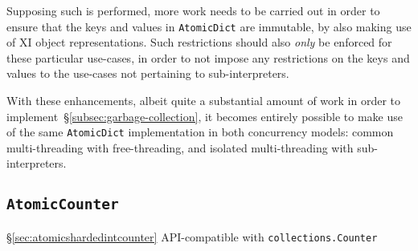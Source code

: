 Supposing such is performed, more work needs to be carried out in order to ensure that the keys and values in \texttt{AtomicDict} are immutable, by also making use of XI object representations.
Such restrictions should also \emph{only} be enforced for these particular use-cases, in order to not impose any restrictions on the keys and values to the use-cases not pertaining to sub-interpreters.

With these enhancements, albeit quite a substantial amount of work in order to implement~\S\ref{subsec:garbage-collection}, it becomes entirely possible to make use of the same \texttt{AtomicDict} implementation in both concurrency models: common multi-threading with free-threading, and isolated multi-threading with sub-interpreters.


\subsection{\texttt{AtomicCounter}}\label{subsec:atomiccounter}
\S\ref{sec:atomicshardedintcounter}
API-compatible with \texttt{collections.Counter}
